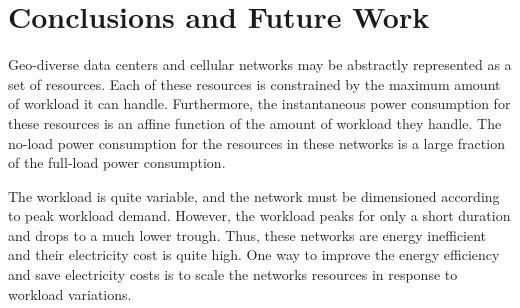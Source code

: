 \chapter{Conclusions and Future Work}
\label{chap:conclusions} Geo-diverse data centers and cellular networks may be abstractly represented as a set of resources. Each of these resources is constrained by the maximum amount of workload it can handle. Furthermore, the instantaneous power consumption for these resources is an affine function of the amount of workload they handle. The no-load power consumption for the resources in these networks is a large fraction of the full-load power consumption. 

The workload is quite variable, and the network must be dimensioned according to peak workload demand. However, the workload peaks for only a short duration and drops to a much lower trough. Thus, these networks are energy inefficient and their electricity cost is quite high. One way to improve the energy efficiency and save electricity costs is to scale the networks resources in response to workload variations.

